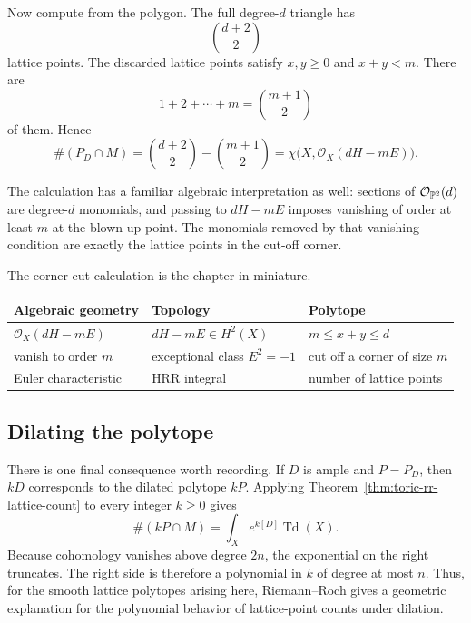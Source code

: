 Now compute from the polygon.  The full degree-\(d\) triangle has
\[
\binom{d+2}{2}
\]
lattice points.  The discarded lattice points satisfy
\(x,y\geq0\) and \(x+y<m\).  There are
\[
1+2+\cdots+m
=
\binom{m+1}{2}
\]
of them.  Hence
\[
\boxed{
\#(P_D\cap M)
=
\binom{d+2}{2}-\binom{m+1}{2}
=
\chi\bigl(X,\mathcal O_X(dH-mE)\bigr).
}
\]

The calculation has a familiar algebraic interpretation as well:
sections of \(\mathcal O_{\mathbb{P}^2}(d)\) are degree-\(d\) monomials, and
passing to \(dH-mE\) imposes vanishing of order at least \(m\) at the
blown-up point.  The monomials removed by that vanishing condition are
exactly the lattice points in the cut-off corner.

\begin{threedictionaries}
The corner-cut calculation is the chapter in miniature.

\medskip

\begin{center}
\small
\begin{tabularx}{\linewidth}{@{}
  >{\raggedright\arraybackslash}X
  >{\raggedright\arraybackslash}X
  >{\raggedright\arraybackslash}X@{}}
\toprule
\textbf{Algebraic geometry}
&
\textbf{Topology}
&
\textbf{Polytope}
\\
\midrule
\(\mathcal O_X(dH-mE)\)
& \(dH-mE\in H^2(X)\)
& \(m\leq x+y\leq d\)
\\
vanish to order \(m\)
& exceptional class \(E^2=-1\)
& cut off a corner of size \(m\)
\\
Euler characteristic
& HRR integral
& number of lattice points
\\
\bottomrule
\end{tabularx}
\end{center}
\end{threedictionaries}

\subsection{Dilating the polytope}

There is one final consequence worth recording.  If \(D\) is ample
and \(P=P_D\), then \(kD\) corresponds to the dilated polytope
\(kP\).  Applying Theorem~\ref{thm:toric-rr-lattice-count} to every
integer \(k\geq0\) gives
\[
\boxed{
\#(kP\cap M)
=
\int_X e^{k[D]}\operatorname{Td}(X).
}
\]
Because cohomology vanishes above degree \(2n\), the exponential on
the right truncates.  The right side is therefore a polynomial in
\(k\) of degree at most \(n\).  Thus, for the smooth lattice polytopes
arising here, Riemann--Roch gives a geometric explanation for the
polynomial behavior of lattice-point counts under dilation.

